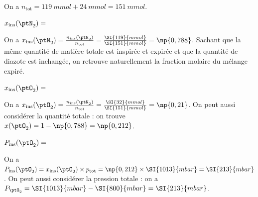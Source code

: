\begin{corrige}
On a $n_\mathrm{tot}=\SI{119}{mmol} + \SI{24}{mmol} =\SI{151}{mmol}$.
\end{corrige}



\begin{enonce}
$x_\mathrm{ins}(\ptN_2)=$
\end{enonce}


\begin{corrige}
On a $x_\mathrm{ins}(\ptN_2) =\frac{n_\mathrm{ins}(\ptN_2)}{n_\mathrm{tot}}=\frac{ \SI{119}{mmol} }{ \SI{151}{mmol} }=\np{0,788}$. Sachant que la même quantité de matière totale est inspirée et expirée et que la quantité de diazote est inchangée, on retrouve naturellement la fraction molaire du mélange expiré.
\end{corrige}



\begin{enonce}
$x_\mathrm{ins}(\ptO_2)=$
\end{enonce}


\begin{corrige}
On a $x_\mathrm{ins}(\ptO_2)=\frac{n_\mathrm{ins} (\ptN_2) }{n_\mathrm{tot}}=\frac{\SI{32}{mmol}}{\SI{151}{mmol}}=\np{0,21}$. On peut aussi considérer la quantité totale : on trouve $x(\ptO_2)=1-\np{0,788}=\np{0,212}$.
\end{corrige}



\begin{enonce}
$P_\mathrm{ins}(\ptO_2)=$
\end{enonce}


\begin{corrige}
On a $P_\mathrm{ins}(\ptO_2) = x_\mathrm{ins}(\ptO_2) \times p_\mathrm{tot}= \np{0,212} \times \SI{1013}{mbar} =\SI{213}{mbar}$. On peut aussi considérer la pression totale : on a $P_{\ptO_2} = \SI{1013}{mbar} - \SI{800}{mbar} = \SI{213}{mbar}$.
\end{corrige}

